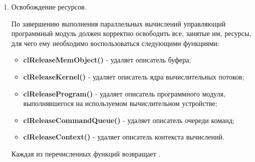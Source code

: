 \begin{enumerate}

		\item Освобождение ресурсов.

			По завершению выполнения параллельных вычислений управляющий программный модуль должен корректно освободить все, занятые им, ресурсы, для чего ему необходимо воспользоваться следующими функциями:

			\newcommand{\openclfirstrelease}[2]{\item {\bf clRelease#1()} - удаляет описатель #2, переданный в функцию первым и единственным параметром}
			\newcommand{\openclrelease}[2]{\item {\bf clRelease#1()} - удаляет описатель #2}

			\begin{itemize}

				\openclrelease{MemObject}{буфера};
				\openclrelease{Kernel}{ядра вычислительных потоков};
				\openclrelease{Program}{программного модуля, выполнявшегося на используемом вычислительном устройстве};
				\openclrelease{CommandQueue}{очереди команд};
				\openclrelease{Context}{контекста вычислений}.

			\end{itemize}

			Каждая из перечисленных функций возвращает \openclsuccess.


\end{enumerate}

